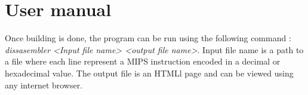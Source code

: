 \section{User manual}

Once building is done, the program can be run using the following command : \textit{dissasembler <Input file name> <output file name>}. Input file name is a path to a file where each line represent a MIPS instruction encoded in a decimal or hexadecimal value. The output file is an HTMLl page and can be viewed using any internet browser. 
